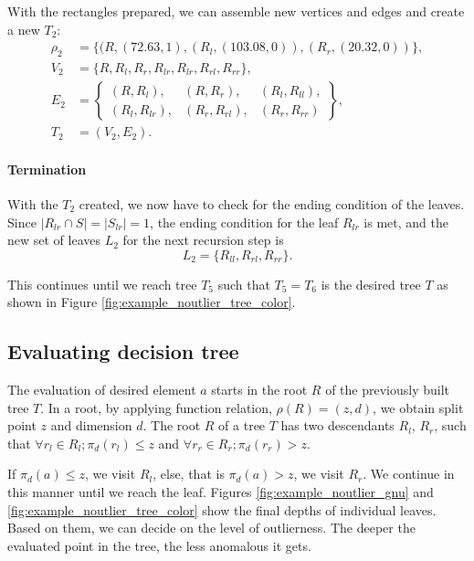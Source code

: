 With the rectangles prepared, we can assemble new vertices and edges and create a new $T_2$:
\begin{align*}
\rho_2 &= \{(R,(72.63,1), (R_l, (103.08, 0)), (R_r, (20.32, 0)) \},\\
V_2 &= \{ R, R_l, R_r, R_{lr}, R_{lr}, R_{rl}, R_{rr} \},\\
E_2 &= \left\{\begin{smallmatrix} 
(R,R_l),&(R,R_r), &(R_l,R_{ll}),\\ 
(R_l,R_{lr}),& (R_r,R_{rl}),& (R_r,R_{rr})
\end{smallmatrix}\right\},\\
T_2 &= (V_2, E_2).
\end{align*}

\paragraph{Termination} With the $T_2$ created, we now have to check for the ending condition of the leaves. Since $|R_{lr}\cap S|=|S_{lr}| = 1$, the ending condition for the leaf $R_{lr}$ is met, and the new set of leaves $L_2$ for the next recursion step is
$$L_2 = \{R_{ll},R_{rl},R_{rr}\}.$$

This continues until we reach tree $T_5$ such that $T_5=T_6$ is the desired tree $T$ as shown in Figure \ref{fig:example_noutlier_tree_color}. 



\subsection{Evaluating decision tree}
The evaluation of desired element $a$ starts in the root $R$ of the previously built tree $T$.
In a root, by applying function relation, $\rho(R) = (z,d)$, we obtain split point $z$ and dimension $d$.
The root $R$ of a tree $T$ has two descendants $R_l$, $R_r$, such that
$\forall r_l\in R_l; \pi_d(r_l) \le z$ and $\forall r_r\in R_r; \pi_d(r_r)  > z$.

If $\pi_d(a)\le z$, we visit $R_l$, else, that is $\pi_d(a) > z$, we visit $R_r$.
We continue in this manner until we reach the leaf. Figures \ref{fig:example_noutlier_gnu} and \ref{fig:example_noutlier_tree_color} show the final depths of individual leaves. Based on them, we can decide on the level of outlierness. The deeper the evaluated point in the tree, the less anomalous it gets.

